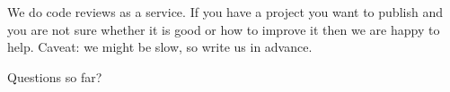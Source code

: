 \documentclass[compress,english,aspectratio=1610]{beamer}
\begin{document}
\begin{frame}
  We do code reviews as a service. If you have a project you want to publish and you are not sure whether it is good or how to improve it then we are happy to help. Caveat: we might be slow, so write us in advance.
\end{frame}

\begin{frame}
  \centering
  Questions so far?
\end{frame}
\end{document}
